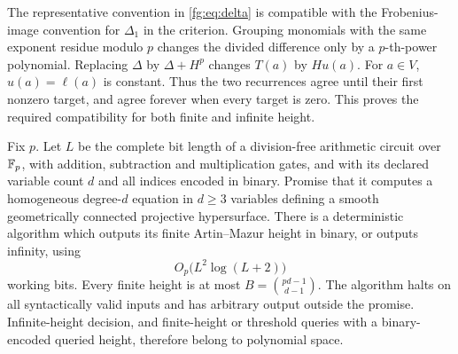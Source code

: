 The representative convention in \eqref{fg:eq:delta} is compatible with
the Frobenius-image convention for $\Delta_1$ in the criterion.
Grouping monomials with the same exponent residue modulo $p$ changes
the divided difference only by a $p$-th-power polynomial. Replacing
$\Delta$ by $\Delta+H^p$ changes $T(a)$ by $H u(a)$.
For $a\in V$, $u(a)=\ell(a)$ is constant. Thus the two recurrences
agree until their first nonzero target, and agree forever when every
target is zero. This proves the required compatibility for both finite
and infinite height.

\begin{theorem}\label{fg:thm:space}
Fix $p$. Let $L$ be the complete bit length of a division-free arithmetic
circuit over $\mathbb F_p$, with addition, subtraction and multiplication gates,
and with its declared variable count $d$ and all indices encoded in
binary. Promise that it computes a homogeneous degree-$d$ equation in
$d\ge3$ variables defining a smooth geometrically connected projective
hypersurface. There is a deterministic algorithm which outputs its
finite Artin--Mazur height in binary, or outputs infinity, using
\[
 O_p\bigl(L^2\log(L+2)\bigr)
\]
working bits. Every finite height is at most $B=\binom{pd-1}{d-1}$.
The algorithm halts on all syntactically valid inputs and has arbitrary
output outside the promise. Infinite-height decision, and finite-height
or threshold queries with a binary-encoded queried height, therefore
belong to polynomial space.
\end{theorem}

